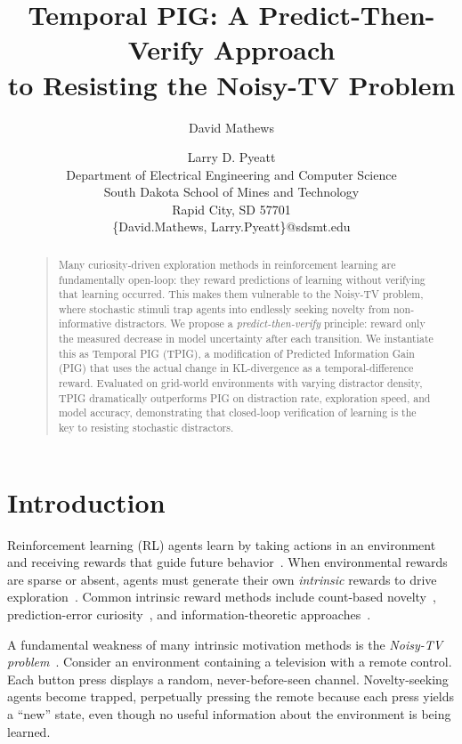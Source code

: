 \documentclass[letterpaper]{article}
\title{Temporal PIG: A Predict-Then-Verify Approach\\to Resisting the Noisy-TV Problem}
\author{David Mathews \and Larry D. Pyeatt\\
Department of Electrical Engineering and Computer Science\\
South Dakota School of Mines and Technology\\
Rapid City, SD 57701\\
\{David.Mathews, Larry.Pyeatt\}@sdsmt.edu
}
\begin{document}
\maketitle

\begin{abstract}
\begin{quote}
Many curiosity-driven exploration methods in reinforcement learning
are fundamentally open-loop: they reward predictions of learning
without verifying that learning occurred.  This makes them vulnerable
to the Noisy-TV problem, where stochastic stimuli trap agents into
endlessly seeking novelty from non-informative distractors.  We
propose a \emph{predict-then-verify} principle: reward only the
measured decrease in model uncertainty after each transition.  We
instantiate this as Temporal PIG (TPIG), a modification of Predicted
Information Gain (PIG) that uses the actual change in KL-divergence
as a temporal-difference reward.  Evaluated on grid-world environments
with varying distractor density, TPIG dramatically outperforms PIG
on distraction rate, exploration speed, and model accuracy,
demonstrating that closed-loop verification of learning is the key to
resisting stochastic distractors.
\end{quote}
\end{abstract}

\section{Introduction}

Reinforcement learning (RL) agents learn by taking actions in an
environment and receiving rewards that guide future
behavior~\cite{Sutton1998,Kaelbling1996RLsurvey}.  When environmental
rewards are sparse or absent, agents must generate their own
\emph{intrinsic} rewards to drive
exploration~\cite{DBLP:journals/corr/abs-1908-06976,FToCFaIM:Jurgen,Oudeyer2007intrinsic}.
Common intrinsic reward methods include count-based
novelty~\cite{DBLP:journals/corr/TangHFSCDSTA16,Bellemare2016counting},
prediction-error
curiosity~\cite{Pathak2017ICM,Rein:VIME}, and information-theoretic
approaches~\cite{10.3389/fncir.2013.00037}.

A fundamental weakness of many intrinsic motivation methods is the
\emph{Noisy-TV problem}~\cite{Burda2019curiosity}.
Consider an environment containing a television with a remote control.
Each button press displays a random, never-before-seen channel.
Novelty-seeking agents become trapped, perpetually pressing the remote
because each press yields a ``new'' state, even though no useful
information about the environment is being learned.
\end{document}
